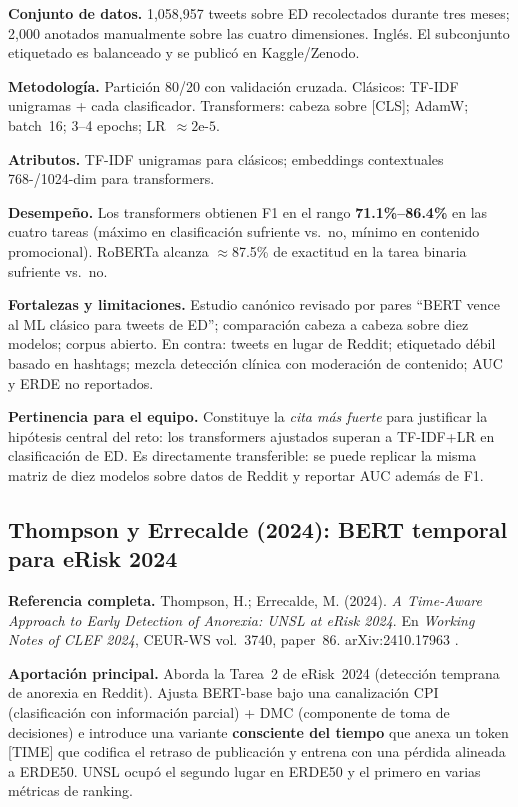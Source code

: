 \documentclass[journal]{IEEEtran}
\begin{document}
\textbf{Conjunto de datos.} 1{,}058{,}957 tweets sobre ED recolectados durante tres meses; 2{,}000 anotados manualmente sobre las cuatro dimensiones. Inglés. El subconjunto etiquetado es balanceado y se publicó en Kaggle/Zenodo.

\textbf{Metodología.} Partición 80/20 con validación cruzada. Clásicos: TF-IDF unigramas + cada clasificador. Transformers: cabeza sobre [CLS]; AdamW; batch~16; 3--4 epochs; LR~$\approx 2\text{e-}5$.

\textbf{Atributos.} TF-IDF unigramas para clásicos; embeddings contextuales 768-/1024-dim para transformers.

\textbf{Desempeño.} Los transformers obtienen F1 en el rango \textbf{71.1\%--86.4\%} en las cuatro tareas (máximo en clasificación sufriente vs.~no, mínimo en contenido promocional). RoBERTa alcanza $\approx$87.5\% de exactitud en la tarea binaria sufriente vs.~no.

\textbf{Fortalezas y limitaciones.} Estudio canónico revisado por pares ``BERT vence al ML clásico para tweets de ED''; comparación cabeza a cabeza sobre diez modelos; corpus abierto. En contra: tweets en lugar de Reddit; etiquetado débil basado en hashtags; mezcla detección clínica con moderación de contenido; AUC y ERDE no reportados.

\textbf{Pertinencia para el equipo.} Constituye la \emph{cita más fuerte} para justificar la hipótesis central del reto: los transformers ajustados superan a TF-IDF+LR en clasificación de ED. Es directamente transferible: se puede replicar la misma matriz de diez modelos sobre datos de Reddit y reportar AUC además de F1.

\subsection{Thompson y Errecalde (2024): BERT temporal para eRisk 2024}

\textbf{Referencia completa.} Thompson, H.; Errecalde, M. (2024). \emph{A Time-Aware Approach to Early Detection of Anorexia: UNSL at eRisk 2024}. En \textit{Working Notes of CLEF 2024}, CEUR-WS vol.~3740, paper~86. arXiv:2410.17963 \cite{thompson2024timeaware}.

\textbf{Aportación principal.} Aborda la Tarea~2 de eRisk~2024 (detección temprana de anorexia en Reddit). Ajusta BERT-base bajo una canalización CPI (clasificación con información parcial) + DMC (componente de toma de decisiones) e introduce una variante \textbf{consciente del tiempo} que anexa un token [TIME] que codifica el retraso de publicación y entrena con una pérdida alineada a ERDE50. UNSL ocupó el segundo lugar en ERDE50 y el primero en varias métricas de ranking.
\end{document}
